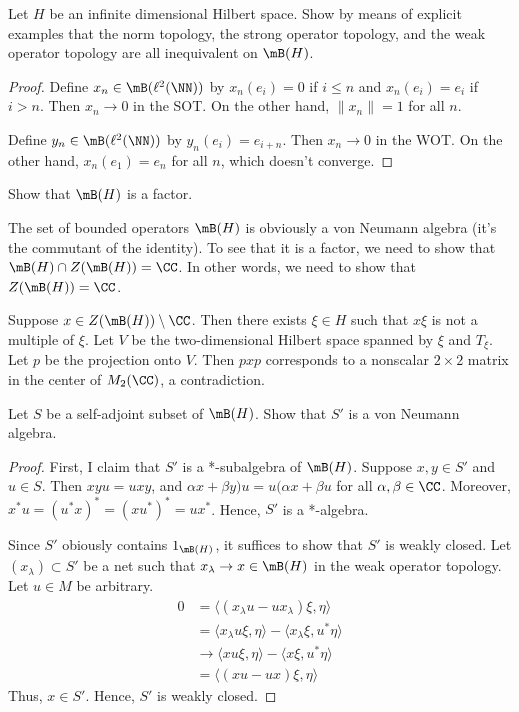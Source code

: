 \documentclass{article}
\begin{document}
 Let $H$ be an infinite dimensional Hilbert space. Show by means of explicit examples that the norm topology, the strong operator topology, and the weak operator topology are all inequivalent on $\mB(H)$.
\begin{proof}
  Define $x_n \in \mB(\ell^2(\NN))$  by $x_n(e_i) = 0$ if $i \le n$ and $x_n(e_i) = e_i$ if $i > n$. Then $x_n \to 0$ in the SOT. On the other hand, $\|x_n\| = 1$ for all $n$.

  Define $y_n \in \mB(\ell^2(\NN))$ by $y_n(e_i) = e_{i+n}$.  Then $x_n \to 0$ in the WOT.  On the other hand, $x_n(e_1) = e_n$ for all $n$, which doesn't converge.
\end{proof}

 Show that $\mB(H)$ is a factor.
\begin{frame}
  The set of bounded operators  $\mB(H)$ is obviously a von Neumann algebra (it's the commutant of the identity).  To see that it is a factor, we need to show that $\mB(H) \cap Z(\mB(H)) = \CC$.  In other words, we need to show that $Z(\mB(H)) = \CC$.

Suppose $x \in Z(\mB(H)) \setminus \CC$.  Then there exists $\xi \in H$ such that $x \xi$ is not a multiple of $\xi$.  Let $V$ be the two-dimensional Hilbert space spanned by $\xi$ and $T_\xi$.  Let $p$ be the projection onto $V$.  Then $pxp$ corresponds to a nonscalar $2\times 2$ matrix in the center of $M_2(\CC)$, a contradiction.
\end{frame}

 Let $S$ be a self-adjoint subset of $\mB(H)$. Show that $S'$ is a von Neumann algebra.
\begin{proof}
  First, I claim that $S'$ is a *-subalgebra of $\mB(H)$.  Suppose $x, y \in S'$ and $u \in S$.  Then $xyu = uxy$, and $\alpha x + \beta y) u = u (\alpha x + \beta u$ for all $\alpha, \beta \in \CC$.  Moreover,  $x^* u  = (u^* x)^* = (x u^*)^* = u x^*$.   Hence, $S'$ is a *-algebra.

  Since $S'$ obiously contains $1_{\mB(H)}$, it suffices to show that $S'$ is weakly closed.  Let $(x_\lambda) \subset S'$ be a net such that  $x_\lambda \to x \in \mB(H)$ in the weak operator topology.  Let $u \in M$ be arbitrary.  
  \begin{align*}
    0 & = \langle (x_\lambda u - u x_\lambda) \xi, \eta \rangle \\
    & = \langle x_\lambda u \xi, \eta \rangle - \langle x_\lambda \xi, u^* \eta \rangle \\
    & \to \langle x u \xi, \eta \rangle - \langle x \xi, u^* \eta \rangle \\
    & = \langle (x u - u x) \xi, \eta \rangle
  \end{align*}
  Thus, $x \in S'$.  Hence, $S'$ is weakly closed.
\end{proof}
\end{document}
